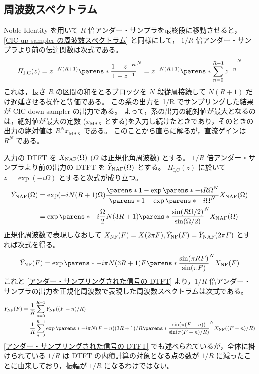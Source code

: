     \subsection{周波数スペクトラム}
        Noble Identity を用いて $R$ 倍アンダー・サンプラを最終段に移動させると，\ref{CIC up-sampler の周波数スペクトラム} と同様にして， $1/R$ 倍アンダー・サンプラより前の伝達関数は次式である。
        \[ H_\text{I,C}(z) = z^{-N(R+1)}\parens*{\frac{1-z^{-R}}{1-z^{-1}}}^N = z^{-N(R+1)}\parens*{\sum_{n=0}^{R-1}z^{-n}}^N \]
        これは，長さ $R$ の区間の和をとるブロックを $N$ 段従属接続して $N(R+1)$ だけ遅延させる操作と等価である。
        この系の出力を 1/R でサンプリングした結果が CIC down-sampler の出力である。
        よって，系の出力の絶対値が最大となるのは，絶対値が最大の定数 ($x_\text{MAX}$ とする)を入力し続けたときであり，そのときの出力の絶対値は $R^N x_\text{MAX}$ である。
        このことから直ちに解るが，直流ゲインは $R^N$ である。
        \par
        入力の DTFT を $X_\text{NAF}(\Omega)$ ($\Omega$ は正規化角周波数) とする。
        $1/R$ 倍アンダー・サンプラより前の出力の DTFT を $\tilde{Y}_\text{NAF}(\Omega)$ とする。
        $H_\text{I,C}(z)$ に於いて $z = \exp(-i\Omega)$ とすると次式が成り立つ。
        \begin{align*}
            \tYNAF(\Omega) &= \exp(-iN(R+1)\Omega)\frac{\parens*{1-\exp\parens*{-iR\Omega}}^N}{\parens*{1-\exp\parens*{-i\Omega}}^N}\XNAF(\Omega) \\
            &= \exp\parens*{-i\frac{\Omega}{2}N(3R+1)}\parens*{\frac{\sin(R\Omega/2)}{\sin(\Omega/2)}}^N \XNAF(\Omega)
        \end{align*}
        正規化周波数で表現しなおして $X_\text{NF}(F) = X(2\pi F), \tilde{Y}_\text{NF}(F) = \tilde{Y}_\text{NAF}(2\pi F)$ とすれば次式を得る。
        \[ \tYNF(F) = \exp\parens*{-i\pi N(3R+1)F}\parens*{\frac{\sin(\pi R F)}{\sin(\pi F)}}^N \XNF(F) \]
        これと \ref{アンダー・サンプリングされた信号の DTFT} より，$1/R$ 倍アンダー・サンプラの出力を正規化周波数で表現した周波数スペクトラムは次式である。
        \begin{align}
            \YNF(F) &= \frac{1}{R}\sum_{n=0}^{R-1} \tYNF((F-n)/R) \nonumber \\
            &= \frac{1}{R}\sum_{n=0}^{R-1} \exp\parens*{-i\pi N(F-n)(3R+1)/R}\parens*{\frac{\sin(\pi(F-n))}{\sin(\pi(F-n)/R)}}^N \XNF((F-n)/R) \label{equation:CIC down-sampler の周波数スペクトラム}
        \end{align}
        \ref{アンダー・サンプリングされた信号の DTFT} でも述べられているが，全体に掛けられている $1/R$ は DTFT の内積計算の対象となる点の数が $1/R$ に減ったことに由来しており，振幅が $1/R$ になるわけではない。
